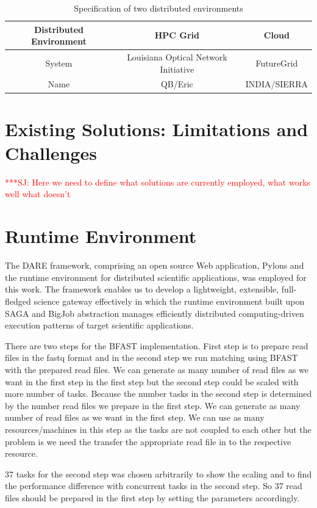 \documentclass[12pt]{article}
\newcommand{\jhanote}[1]{ {\textcolor{red}     {***SJ: #1}}}
\newcommand{\jhanote}[1]{}
\begin{document}
 \begin{table}
 \begin{tabular}{|c|cc|} 
 \hline 
Distributed Environment &  HPC Grid &  Cloud \\ \hline
System  &  Louisiana Optical Network Initiative & FutureGrid \\
Name &  QB/Eric   &  INDIA/SIERRA \\
 \hline
 \end{tabular}
\caption{Specification of two distributed environments}
\label{table:two-systems} 
\end{table}
 
\section{Existing Solutions: Limitations and Challenges}

\jhanote{Here we need to define what solutions are currently employed, what works well
  what doesn't}

\section{Runtime Environment}

The DARE framework, comprising an open source Web application, Pylons
and the runtime environment for distributed scientific applications,
was employed for this work.  The framework enables us to develop a
lightweight, extensible, full-fledged science gateway effectively in
which the runtime environment built upon SAGA and BigJob abstraction
manages efficiently distributed computing-driven execution patterns of
target scientific applications.

There are two steps for the BFAST implementation. First step is to prepare read files in the 
fastq format and in the second step we run matching using BFAST with the prepared read files.
 We can generate as many number of read files as we want in the first step in the first step
 but the second step could be scaled with more number of tasks. Because the number tasks 
 in the second step is determined by the number read files we prepare in the first step. We 
 can generate as many number of read files as we want in the first step. We can use as many resources/machines 
 in this step as the tasks are not coupled to each other but the problem is we need the transfer the appropriate read file
in to the respective resource.

37 tasks for the second step was chosen arbitrarily to show the scaling  and to find the performance 
difference with concurrent tasks in the second step. So 37 read files should be prepared in the
 first step by setting the parameters accordingly.
\end{document}
